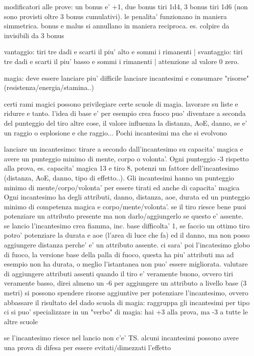 \documentclass[12pt,a4paper,twoside,openany,twocolumn]{book}
\begin{document}
modificatori alle prove: un bonus e' +1, due bonus tiri 1d4, 3 bonus tiri 1d6 (non sono provisti oltre 3 bonus cumulativi). le penalita' funzionano in maniera simmetrica. bonus e malus si annullano in maniera reciproca. es. colpire da invisibili da 3 bonus

vantaggio: tiri tre dadi e scarti il piu' alto e sommi i rimanenti  |  svantaggio: tiri tre dadi e scarti il piu' basso e sommi i rimanenti | attenzione al valore 0 zero.

magia: deve essere lanciare piu' difficile lanciare incantesimi e consumare "risorse" (resistenza/energia/stamina..)

certi rami magici possono privilegiare certe scuole di magia. lavorare su liste e ridurre e tanto. l'idea di base e' per esempio crea fuoco puo' diventare a seconda del punteggio del tiro altre cose, il valore influenza la distanza, AoE, danno, se e' un raggio o esplosione e che raggio...  Pochi incantesimi ma che si evolvono

lanciare un incantesimo: tirare a secondo dall'incantesimo su capacita' magica e avere un punteggio minimo di  mente, corpo o volonta'.  Ogni punteggio -3 rispetto alla prova, es. capacita' magica 13 e tiro 8, potenzi un fattore dell'incantesimo (distanza, AoE, danno, tipo di effetto..). Gli incantesimi hanno un punteggio minimo di mente/corpo/volonta' per essere tirati ed anche di capacita' magica
Ogni incantesimo ha degli attributi, danno, distanza, aoe, durata ed un punteggio minimo di competenza magica e corpo/mente/volonta'. se il tiro riesce bene puoi potenziare un attributo presente ma non darlo/aggiungerlo se questo e' assente. se lancio l'incantesimo crea fiamma, inc. base difficolta' 1, se faccio un ottimo tiro potro' potenziare la durata e aoe (l'area di luce che fa) ed il danno, ma non posso aggiungere distanza perche' e' un attributo assente.
ci sara' poi l'incatesimo globo di fuoco, la versione base della palla di fuoco, questa ha piu' attributi ma ad esempio non ha durata, o meglio l'istantanea non puo' essere migliorata.
valutare di aggiungere attributi assenti quando il tiro e' veramente buono, ovvero tiri veramente basso, direi almeno un -6 per aggiungere un attributo a livello base (3 metri)
si possono spendere risorse aggiuntive per potenziare l'incantesimo, ovvero abbassare il risultato del dado
scuola di magia: raggruppa gli incantesimi per tipo
ci si puo' specializzare in un "verbo" di magia: hai +3 alla prova, ma -3 a tutte le altre scuole

se l'incantesimo riesce nel lancio non c'e' TS. alcuni incantesimi possono avere una prova di difesa per essere evitati/dimezzati l'effetto
\end{document}
